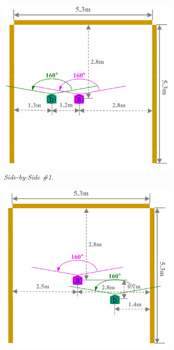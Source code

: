 \begin{figure}[!ht]
	\centering
	\begin{subfigure}[c]{0.45\textwidth}
		\includegraphics[width=\textwidth]{img/lidar-interference/kim-setup-side-by-side-1.png}
		\caption{\textit{Side-by-Side \#1}.}
		\label{fig:kim-side-by-side-1}
	\end{subfigure}
	\quad
	\begin{subfigure}[c]{0.45\textwidth}
		\includegraphics[width=\textwidth]{img/lidar-interference/kim-setup-side-by-side-2.png}

\end{subfigure}
\end{figure}
